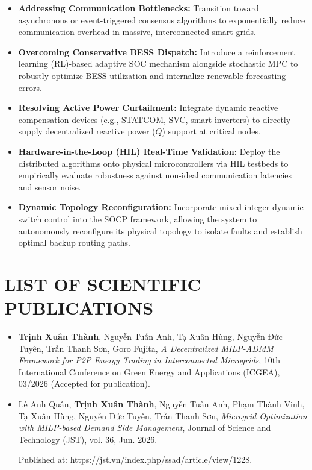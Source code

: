 \documentclass{thesis_1side}
\begin{document}
\begin{itemize}
    \item \textbf{Addressing Communication Bottlenecks:} Transition toward asynchronous or event-triggered consensus algorithms to exponentially reduce communication overhead in massive, interconnected smart grids.
    \item \textbf{Overcoming Conservative BESS Dispatch:} Introduce a reinforcement learning (RL)-based adaptive SOC mechanism alongside stochastic MPC to robustly optimize BESS utilization and internalize renewable forecasting errors.
    \item \textbf{Resolving Active Power Curtailment:} Integrate dynamic reactive compensation devices (e.g., STATCOM, SVC, smart inverters) to directly supply decentralized reactive power ($Q$) support at critical nodes.
    \item \textbf{Hardware-in-the-Loop (HIL) Real-Time Validation:} Deploy the distributed algorithms onto physical microcontrollers via HIL testbeds to empirically evaluate robustness against non-ideal communication latencies and sensor noise.
    \item \textbf{Dynamic Topology Reconfiguration:} Incorporate mixed-integer dynamic switch control into the SOCP framework, allowing the system to autonomously reconfigure its physical topology to isolate faults and establish optimal backup routing paths.
\end{itemize}

\newpage

\section*{LIST OF SCIENTIFIC PUBLICATIONS}

\begin{flushleft}
\begin{itemize}
    \item \textbf{Trịnh Xuân Thành}, Nguyễn Tuấn Anh, Tạ Xuân Hùng, Nguyễn Đức Tuyên, Trần Thanh Sơn, Goro Fujita, 
          \textit{A Decentralized MILP-ADMM Framework for P2P Energy Trading in Interconnected Microgrids}, 10th International Conference on Green Energy and Applications (ICGEA), 03/2026 
          (Accepted for publication).
    \item Lê Anh Quân, \textbf{Trịnh Xuân Thành}, Nguyễn Tuấn Anh, Phạm Thành Vinh, Tạ Xuân Hùng, Nguyễn Đức Tuyên, Trần Thanh Sơn, 
          \textit{Microgrid Optimization with MILP-based Demand Side Management}, Journal of Science and Technology (JST), vol. 36, Jun. 2026. 
          
          Published at: https://jst.vn/index.php/ssad/article/view/1228.
\end{itemize}
\end{flushleft}
\end{document}
